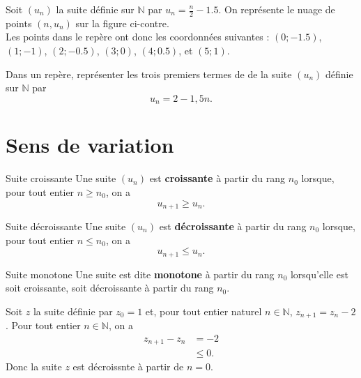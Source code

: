 \documentclass[11pt]{article}
\begin{document}
\begin{exemple}
\begin{minipage}{.5\textwidth}
  Soit $(u_n)$ la suite définie sur $\mathbb{N}$ par $u_n=\frac{n}{2}-1.5$. On
  représente le nuage de points $(n, u_n)$ sur la figure ci-contre.\\
  Les points
  dans le repère ont donc les coordonnées suivantes :
  $(0; -1.5)$,
  $(1; -1)$,
  $(2; -0.5)$,
  $(3; 0)$,
  $(4; 0.5)$, et
  $(5; 1)$.
\end{minipage}
\begin{minipage}{.5\textwidth}
\begin{center}
\end{center}
\end{minipage}
\end{exemple}

\begin{app}
  Dans un repère, représenter les trois premiers termes de de la suite $(u_n)$
  définie sur $\mathbb{N}$ par
  \[
    u_n=2-1,5n.
  \]
\end{app}
\section{Sens de variation}

\begin{defi}{Suite croissante}
  Une suite $(u_n)$ est \textbf{croissante} à partir du rang $n_0$ lorsque, pour
  tout entier $n\geq n_0$, on a 
  \[
    u_{n+1}\geq u_n.
  \]
\end{defi}

\begin{defi}{Suite décroissante}
  Une suite $(u_n)$ est \textbf{décroissante} à partir du rang $n_0$ lorsque, pour
  tout entier $n\leq n_0$, on a 
  \[
    u_{n+1}\leq u_n.
  \]
\end{defi}

\begin{defi}{Suite monotone}
  Une suite est dite \textbf{monotone} à partir du rang $n_0$ lorsqu'elle est
  soit croissante, soit décroissante à partir du rang $n_0$.
\end{defi}

\begin{exemple}
  Soit $z$ la suite définie par $z_0=1$ et, pour tout entier naturel
  $n\in\mathbb{N}$, $z_{n+1}=z_n-2$. Pour tout entier $n\in\mathbb{N}$, on a
  \begin{align*}
    z_{n+1}-z_n&=-2 \\
    &\leq0.
  \end{align*}
  Donc la suite $z$ est décroissnte à partir de $n=0$.
\end{exemple}
\end{document}
